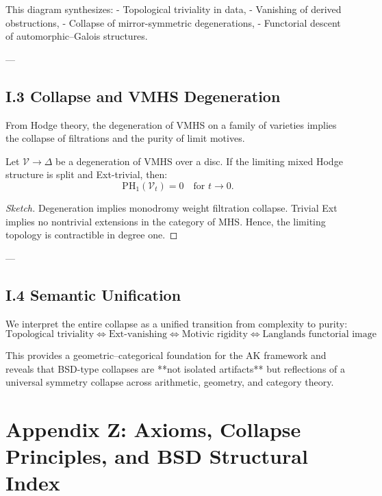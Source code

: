 This diagram synthesizes:
- Topological triviality in data,
- Vanishing of derived obstructions,
- Collapse of mirror-symmetric degenerations,
- Functorial descent of automorphic–Galois structures.

---

\subsection*{I.3 Collapse and VMHS Degeneration}

From Hodge theory, the degeneration of VMHS on a family of varieties  
implies the collapse of filtrations and the purity of limit motives.

\begin{proposition}
Let \( \mathcal{V} \to \Delta \) be a degeneration of VMHS over a disc.  
If the limiting mixed Hodge structure is split and Ext-trivial, then:
\[
\mathrm{PH}_1(\mathcal{V}_t) = 0 \quad \text{for } t \to 0.
\]
\end{proposition}

\begin{proof}[Sketch]
Degeneration implies monodromy weight filtration collapse.  
Trivial Ext implies no nontrivial extensions in the category of MHS.  
Hence, the limiting topology is contractible in degree one.
\end{proof}

---

\subsection*{I.4 Semantic Unification}

We interpret the entire collapse as a unified transition from complexity to purity:
\[
\boxed{
\text{Topological triviality} \Leftrightarrow \text{Ext-vanishing} \Leftrightarrow \text{Motivic rigidity} \Leftrightarrow \text{Langlands functorial image}
}
\]

This provides a geometric–categorical foundation for the AK framework  
and reveals that BSD-type collapses are **not isolated artifacts**  
but reflections of a universal symmetry collapse across arithmetic, geometry, and category theory.




\section*{Appendix Z: Axioms, Collapse Principles, and BSD Structural Index}

